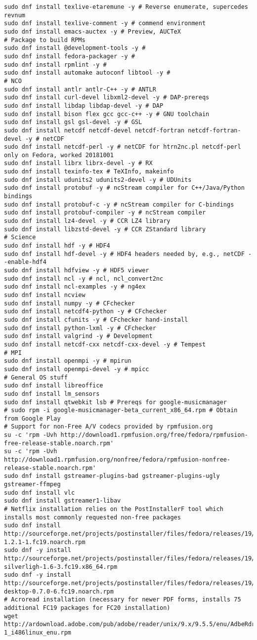 \documentclass[12pt,twoside]{article}
\begin{document}
\begin{verbatim}
sudo dnf install texlive-etaremune -y # Reverse enumerate, supercedes revnum
sudo dnf install texlive-comment -y # commend environment
sudo dnf install emacs-auctex -y # Preview, AUCTeX
# Package to build RPMs
sudo dnf install @development-tools -y #
sudo dnf install fedora-packager -y #
sudo dnf install rpmlint -y # 
sudo dnf install automake autoconf libtool -y #
# NCO
sudo dnf install antlr antlr-C++ -y # ANTLR
sudo dnf install curl-devel libxml2-devel -y # DAP-prereqs
sudo dnf install libdap libdap-devel -y # DAP
sudo dnf install bison flex gcc gcc-c++ -y # GNU toolchain
sudo dnf install gsl gsl-devel -y # GSL
sudo dnf install netcdf netcdf-devel netcdf-fortran netcdf-fortran-devel -y # netCDF
sudo dnf install netcdf-perl -y # netCDF for htrn2nc.pl netcdf-perl only on Fedora, worked 20181001
sudo dnf install librx librx-devel -y # RX
sudo dnf install texinfo-tex # TeXInfo, makeinfo
sudo dnf install udunits2 udunits2-devel -y # UDUnits
sudo dnf install protobuf -y # ncStream compiler for C++/Java/Python bindings
sudo dnf install protobuf-c -y # ncStream compiler for C-bindings
sudo dnf install protobuf-compiler -y # ncStream compiler
sudo dnf install lz4-devel -y # CCR LZ4 library
sudo dnf install libzstd-devel -y # CCR ZStandard library
# Science
sudo dnf install hdf -y # HDF4
sudo dnf install hdf-devel -y # HDF4 headers needed by, e.g., netCDF --enable-hdf4
sudo dnf install hdfview -y # HDF5 viewer
sudo dnf install ncl -y # ncl, ncl_convert2nc
sudo dnf install ncl-examples -y # ng4ex
sudo dnf install ncview
sudo dnf install numpy -y # CFchecker
sudo dnf install netcdf4-python -y # CFchecker
sudo dnf install cfunits -y # CFchecker hand-install
sudo dnf install python-lxml -y # CFchecker
sudo dnf install valgrind -y # Development
sudo dnf install netcdf-cxx netcdf-cxx-devel -y # Tempest
# MPI
sudo dnf install openmpi -y # mpirun
sudo dnf install openmpi-devel -y # mpicc
# General OS stuff
sudo dnf install libreoffice
sudo dnf install lm_sensors
sudo dnf install qtwebkit lsb # Prereqs for google-musicmanager
# sudo rpm -i google-musicmanager-beta_current_x86_64.rpm # Obtain from Google Play
# Support for non-Free A/V codecs provided by rpmfusion.org
su -c 'rpm -Uvh http://download1.rpmfusion.org/free/fedora/rpmfusion-free-release-stable.noarch.rpm'
su -c 'rpm -Uvh http://download1.rpmfusion.org/nonfree/fedora/rpmfusion-nonfree-release-stable.noarch.rpm'
sudo dnf install gstreamer-plugins-bad gstreamer-plugins-ugly gstreamer-ffmpeg
sudo dnf install vlc
sudo dnf install gstreamer1-libav
# Netflix installation relies on the PostInstallerF tool which installs most commonly requested non-free packages
sudo dnf install http://sourceforge.net/projects/postinstaller/files/fedora/releases/19/x86_64/updates/postinstallerf-1.2.1-1.fc19.noarch.rpm 
sudo dnf -y install http://sourceforge.net/projects/postinstaller/files/fedora/releases/19/x86_64/updates/wine-silverligh-1.6-3.fc19.x86_64.rpm
sudo dnf -y install http://sourceforge.net/projects/postinstaller/files/fedora/releases/19/x86_64/updates/netflix-desktop-0.7.0-6.fc19.noarch.rpm
# Acroread installation (necessary for newer PDF forms, installs 75 additional FC19 packages for FC20 installation)
wget http://ardownload.adobe.com/pub/adobe/reader/unix/9.x/9.5.5/enu/AdbeRdr9.5.5-1_i486linux_enu.rpm


\end{verbatim}
\end{document}

